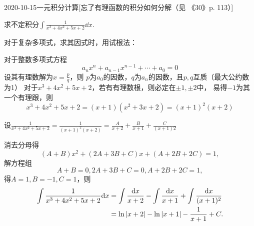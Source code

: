 \documentclass{ctexart}
\begin{document}
\begin{mathques}{2020-10-15}{一元积分计算}[忘了有理函数的积分如何分解（见
  《30》p. 113）]
\begin{ques}
  求不定积分$\int \frac{1}{x^3 + 4x^2 + 5x + 2}\dd x.$
\end{ques}
\begin{solu}
  \begin{mathideabox}[试根法]
  对于复杂多项式，求其因式时，用试根法：

  对于整数多项式方程
  \[
  a_nx^n + a_{n - 1}x^{n - 1} + \dotsb + a_0 = 0
  \]
  设其有理数解为$x = \frac{p}{q}$，则
  $p$为$a_0$的因数，$q$为$a_n$的因数，且$p, q$互质（最大公约数为1）
  \tcblower
  对于$x^3 + 4x^2 + 5x + 2$，若有有理数根，则必定在$\pm1, \pm2$中，
  易得$-1$为其一个有理跟，则
  \[
    x^3 + 4x^2 + 5x + 2 = (x + 1)(x^2 + 3x + 2) = (x + 1)^2(x + 2)
  \]
  \end{mathideabox}
设$\frac{1}{x^3 + 4x^2 + 5x + 2} = \frac{1}{(x + 1)^2 (x + 2)} = \frac{A}{x +
2} + \frac{B}{x + 1} + \frac{C}{(x + 1)2}$

消去分母得
\[
  (A + B)x^2 + (2A + 3B +C)x + (A + 2B + 2C) = 1,
\]
解方程组
\[
A + B = 0,
2A + 3B + C = 0,
A + 2B + 2C = 1,
\]
得$A = 1, B = -1, C = 1$，则
\begin{align*}
  \int \frac{1}{x^3 + 4x^2 + 5x + 2}\dd x &= \int \frac{\dd x}{x + 2} - \int
  \frac{\dd x}{x + 1} + \int \frac{\dd x}{(x + 1)^2}\\
  &= \ln\abs{x + 2} - \ln\abs{x + 1} - \frac{1}{x + 1} + C.
\end{align*}
\end{solu}
\end{mathques}
\end{document}
